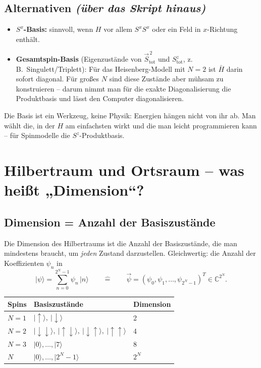 \documentclass[11pt,a4paper]{article}
\newcommand{\ket}[1]{\lvert #1\rangle}
\newcommand{\up}{{\uparrow}}
\newcommand{\dn}{{\downarrow}}
\newcommand{\Hbar}{\bar H}
\begin{document}
\subsection{Alternativen \emph{(über das Skript hinaus)}}
\begin{itemize}[itemsep=2pt]
\item \textbf{$S^x$-Basis:} sinnvoll, wenn $H$ vor allem $S^xS^x$ oder ein Feld in $x$-Richtung enthält.
\item \textbf{Gesamtspin-Basis} (Eigenzustände von $\vec S_\text{tot}^{\,2}$ und $S^z_\text{tot}$, z.\,B.\ Singulett/Triplett): Für das Heisenberg-Modell mit $N=2$ ist $\Hbar$ darin sofort diagonal. Für großes $N$ sind diese Zustände aber mühsam zu konstruieren -- darum nimmt man für die exakte Diagonalisierung die Produktbasis und lässt den Computer diagonalisieren.
\end{itemize}

\begin{merk}
Die Basis ist ein Werkzeug, keine Physik: Energien hängen nicht von ihr ab. Man wählt die, in der $H$ am einfachsten wirkt und die man leicht programmieren kann -- für Spinmodelle die $S^z$-Produktbasis.
\end{merk}

\section{Hilbertraum und Ortsraum -- was heißt „Dimension“?}

\subsection{Dimension = Anzahl der Basiszustände}

Die Dimension des Hilbertraums ist die Anzahl der Basiszustände, die man mindestens braucht, um \emph{jeden} Zustand darzustellen. Gleichwertig: die Anzahl der Koeffizienten $\psi_n$ in
\[
\ket\psi = \sum_{n=0}^{2^N-1}\psi_n\,\ket n
\qquad\widehat{=}\qquad
\vec\psi = (\psi_0,\psi_1,\dots,\psi_{2^N-1})^T\in\mathbb C^{2^N}.
\]

\begin{center}
\begin{tabular}{@{}lll@{}}
\toprule
Spins & Basiszustände & Dimension\\
\midrule
$N=1$ & $\ket\up,\ \ket\dn$ & 2\\
$N=2$ & $\ket{\dn\dn},\ \ket{\up\dn},\ \ket{\dn\up},\ \ket{\up\up}$ & 4\\
$N=3$ & $\ket 0,\dots,\ket 7$ & 8\\
$N$ & $\ket 0,\dots,\ket{2^N-1}$ & $2^N$\\
\bottomrule
\end{tabular}
\end{center}
\end{document}
